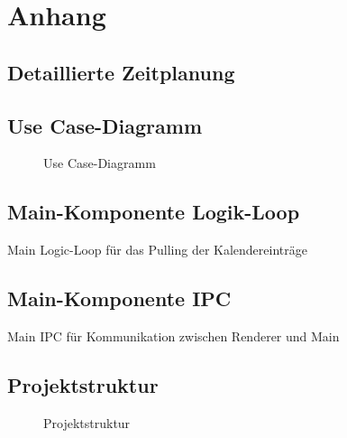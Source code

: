 \section{Anhang}
\subsection{Detaillierte Zeitplanung}
\label{app:Zeitplanung}



\clearpage



\subsection{Use Case-Diagramm}
\label{app:UseCase}
\begin{figure}[htb]
\centering
{}
\caption{Use Case-Diagramm}
\end{figure}

%
%
\clearpage


\clearpage

%
%

\subsection{Main-Komponente Logik-Loop}
\label{app:MAINLOOP}
Main Logic-Loop für das Pulling der Kalendereinträge

\clearpage

\subsection{Main-Komponente IPC}
\label{app:MAINIPC}
Main \ac{IPC} für Kommunikation zwischen Renderer und Main

\clearpage

\subsection{Projektstruktur}
\label{app:Projektstruktur}
\begin{figure}[htb]
\centering
{}
\caption{Projektstruktur}
\end{figure}
\clearpage

%
